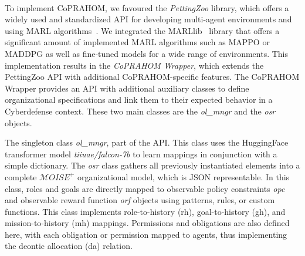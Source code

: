 \documentclass[conference]{IEEEtran}
\newcounter{relation}
\begin{document}

\

To implement CoPRAHOM, we favoured the \emph{PettingZoo} library, which offers a widely used and standardized API for developing multi-agent environments and using MARL algorithms~\cite{Terry2021}. We integrated the MARLlib~\cite{hu2022marllib} library that offers a significant amount of implemented MARL algorithms such as MAPPO or MADDPG as well as fine-tuned models for a wide range of environments. This implementation results in the \textit{CoPRAHOM Wrapper}, which extends the PettingZoo API with additional CoPRAHOM-specific features.
%
The CoPRAHOM Wrapper provides an API with additional auxiliary classes to define organizational specifications and link them to their expected behavior in a Cyberdefense context. These two main classes are the \textit{ol\_mngr} and the \textit{osr} objects.

The singleton class \textit{ol\_mngr}, part of the API. This class uses the HuggingFace transformer model \textit{tiiuae/falcon-7b} to learn mappings in conjunction with a simple dictionary.
The \textit{osr} class gathers all previously instantiated elements into a complete $\mathcal{M}OISE^+$ organizational model, which is JSON representable. In this class, roles and goals are directly mapped to observable policy constraints \textit{opc} and observable reward function \textit{orf} objects using patterns, rules, or custom functions. This class implements role-to-history (rh), goal-to-history (gh), and mission-to-history (mh) mappings. Permissions and obligations are also defined here, with each obligation or permission mapped to agents, thus implementing the deontic allocation (da) relation.
\end{document}
